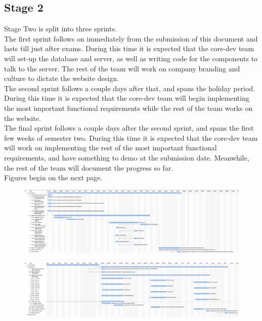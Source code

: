 \documentclass[11pt, a4paper]{report}
\begin{document}
\subsection{Stage 2}
Stage Two is split into three sprints. \\ 
The first sprint follows on immediately from the submission of this document and lasts till just after exams. During this time it is expected that the core-dev team will set-up the database and server, as well as writing code for the components to talk to the server. The rest of the team will work on company branding and culture to dictate the website design.\\
The second sprint follows a couple days after that, and spans the holiday period. During this time it is expected that the core-dev team will begin implementing the most important functional requirements while the rest of the team works on the website.\\
The final sprint follows a couple days after the second sprint, and spans the first few weeks of semester two. During this time it is expected that the core-dev team will work on implementing the rest of the most important functional requirements, and have something to demo at the submission date. Meanwhile, the rest of the team will document the progress so far. \\

Figures begin on the next page.

\begin{figure}
\centering
\includegraphics[scale=0.25]{Figures/Plan2-1.png}
\end{figure}

\begin{figure}
\centering
\includegraphics[scale=0.25]{Figures/Plan2-2.png}
\end{figure}
\end{document}
